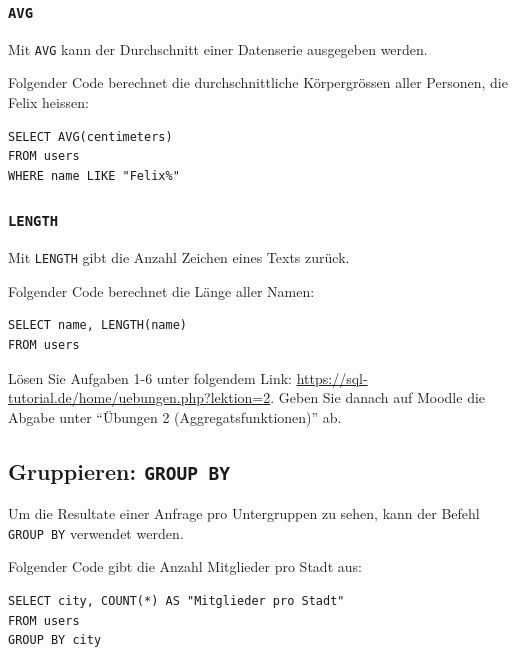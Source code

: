 \subsubsection{\texorpdfstring{\lstinline[style=sql]|AVG|}{AVG}}

Mit \lstinline[style=sql]|AVG| kann der Durchschnitt einer Datenserie ausgegeben werden.

\begin{myexample}
Folgender Code berechnet die durchschnittliche Körpergrössen aller Personen, die Felix heissen:

\begin{lstlisting}[style=sql]
SELECT AVG(centimeters) 
FROM users 
WHERE name LIKE "Felix%"
\end{lstlisting}
\end{myexample}

\subsubsection{\texorpdfstring{\lstinline[style=sql]|LENGTH|}{LENGTH}}

Mit \lstinline[style=sql]|LENGTH| gibt die Anzahl Zeichen eines Texts zurück.

\begin{myexample}
Folgender Code berechnet die Länge aller Namen:

\begin{lstlisting}[style=sql]
SELECT name, LENGTH(name) 
FROM users
\end{lstlisting}
\end{myexample}

\begin{mysubmission}
Lösen Sie Aufgaben 1-6 unter folgendem Link: \url{https://sql-tutorial.de/home/uebungen.php?lektion=2}. Geben Sie danach auf Moodle die Abgabe unter ``Übungen 2 (Aggregatsfunktionen)'' ab.
\end{mysubmission}

\subsection{Gruppieren: \texorpdfstring{\lstinline[style=sql]|GROUP BY|}{GROUP BY}}
Um die Resultate einer Anfrage pro Untergruppen zu sehen, kann der Befehl \lstinline[style=sql]|GROUP BY| verwendet werden.

\begin{myexample}
Folgender Code gibt die Anzahl Mitglieder pro Stadt aus:
\begin{lstlisting}[style=sql]
SELECT city, COUNT(*) AS "Mitglieder pro Stadt" 
FROM users 
GROUP BY city
\end{lstlisting}
\end{myexample}

